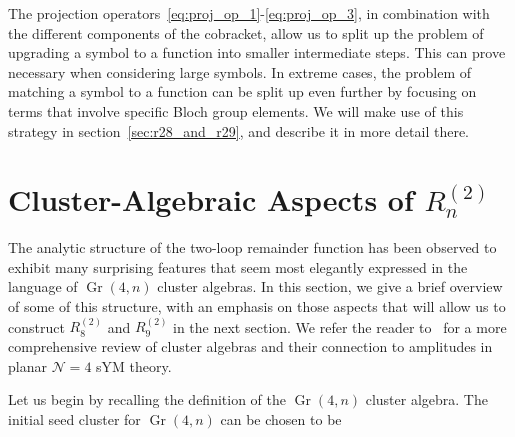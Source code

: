\documentclass[11pt]{article}
\DeclareMathOperator{\Gr}{Gr}
\def\pdfeq#1{\texorpdfstring{$#1$}{a}}
\begin{document}
The projection operators~\eqref{eq:proj_op_1}-\eqref{eq:proj_op_3}, in combination with the different components of the cobracket, allow us to split up the problem of upgrading a symbol to a function into smaller intermediate steps. This can prove necessary when considering large symbols. In extreme cases, the problem of matching a symbol to a function can be split up even further by focusing on terms that involve specific Bloch group elements. We will make use of this strategy in section~\ref{sec:r28_and_r29}, and describe it in more detail there. 


\section{Cluster-Algebraic Aspects of \pdfeq{R_n^{(2)}}}
\label{sec:cluster_algebraic_structure}

The analytic structure of the two-loop remainder function has been observed to exhibit many surprising features that seem most elegantly expressed in the language of $\Gr(4,n)$ cluster algebras.  In this section, we give a brief overview of some of this structure, with an emphasis on those aspects that will allow us to construct $R_8^{(2)}$\! and $R_9^{(2)}$\! in the next section. We refer the reader to~\cite{Golden:2018gtk} for a more comprehensive review of cluster algebras and their connection to amplitudes in planar $\mathcal{N} = 4$ sYM theory. 

Let us begin by recalling the definition of the $\Gr(4,n)$ cluster algebra. The initial seed cluster for $\Gr(4,n)$ can be chosen to be~\cite{1088.22009}
\end{document}
